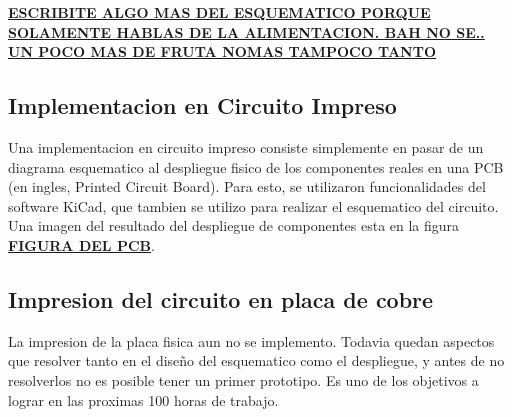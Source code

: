 \textbf{\underline{ESCRIBITE ALGO MAS DEL ESQUEMATICO PORQUE SOLAMENTE HABLAS DE LA ALIMENTACION. BAH NO SE.. UN POCO MAS DE FRUTA NOMAS TAMPOCO TANTO}}




\subsection{Implementacion en Circuito Impreso} %
\label{sub:implementacion_en_circuito_impreso}

Una implementacion en circuito impreso consiste simplemente en pasar de un diagrama esquematico al despliegue fisico de los componentes reales en una PCB (en ingles, Printed Circuit Board). Para esto, se utilizaron funcionalidades del software KiCad, que tambien se utilizo para realizar el esquematico del circuito. Una imagen del resultado del despliegue de componentes esta en la figura \textbf{\underline{FIGURA DEL PCB}}.


\subsection{Impresion del circuito en placa de cobre} %
\label{sub:impresion_del_circuito_en_placa_de_cobre}

La impresion de la placa fisica aun no se implemento. Todavia quedan aspectos que resolver tanto en el dise\~no del esquematico como el despliegue, y antes de no resolverlos no es posible tener un primer prototipo. Es uno de los objetivos a lograr en las proximas 100 horas de trabajo.


